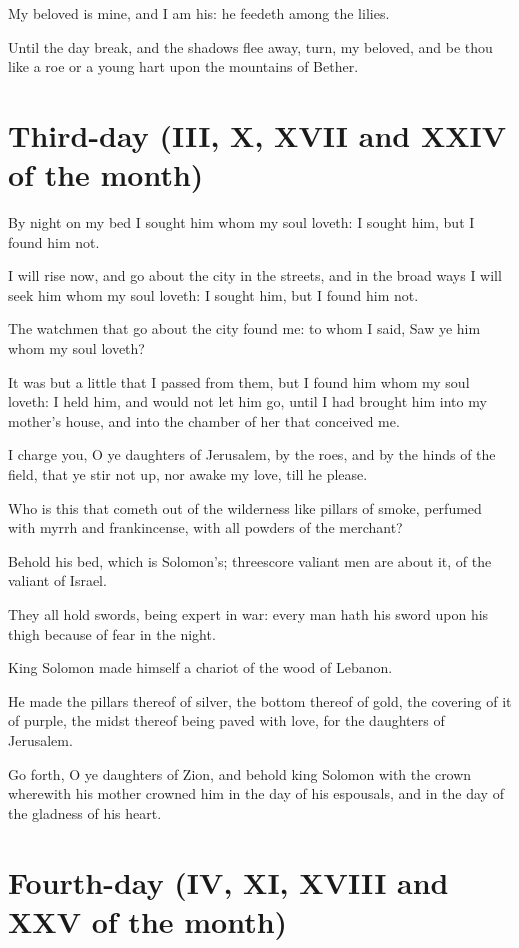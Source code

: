My beloved is mine, and I am his: he feedeth among the lilies.

Until the day break, and the shadows flee away, turn, my beloved, and be thou like a roe or a young hart upon the mountains of Bether.

\section*{Third-day (III, X, XVII and XXIV of the month)}

By night on my bed I sought him whom my soul loveth: I sought him, but I found him not.

I will rise now, and go about the city in the streets, and in the broad ways I will seek him whom my soul loveth: I sought him, but I found him not.

The watchmen that go about the city found me: to whom I said, Saw ye him whom my soul loveth?

It was but a little that I passed from them, but I found him whom my soul loveth: I held him, and would not let him go, until I had brought him into my mother's house, and into the chamber of her that conceived me.

I charge you, O ye daughters of Jerusalem, by the roes, and by the hinds of the field, that ye stir not up, nor awake my love, till he please.

Who is this that cometh out of the wilderness like pillars of smoke, perfumed with myrrh and frankincense, with all powders of the merchant?

Behold his bed, which is Solomon's; threescore valiant men are about it, of the valiant of Israel.

They all hold swords, being expert in war: every man hath his sword upon his thigh because of fear in the night.

King Solomon made himself a chariot of the wood of Lebanon.

He made the pillars thereof of silver, the bottom thereof of gold, the covering of it of purple, the midst thereof being paved with love, for the daughters of Jerusalem.

Go forth, O ye daughters of Zion, and behold king Solomon with the crown wherewith his mother crowned him in the day of his espousals, and in the day of the gladness of his heart.

\section*{Fourth-day (IV, XI, XVIII and XXV of the month)}

